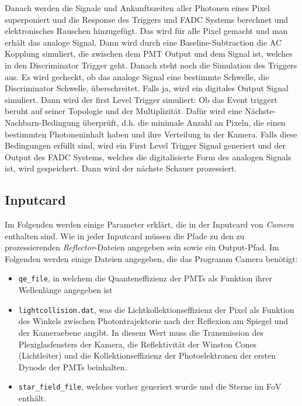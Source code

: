 Danach werden die Signale und Ankunftszeiten aller Photonen eines Pixel superponiert und die Response des Triggers und FADC Systems berechnet und elektronisches Rauschen hinzugefügt.
Das wird für alle Pixel gemacht und man erhält das analoge Signal.
Dann wird durch eine Baseline-Subtraction die AC Kopplung simuliert, die zwischen dem PMT Output und dem Signal ist, welches in den Discriminator Trigger geht.
Danach steht noch die Simulation des Triggers aus. 
Es wird gecheckt, ob das analoge Signal eine bestimmte Schwelle, die Discriminator Schwelle, überschreitet.
Falls ja, wird ein digitales Output Signal simuliert.
Dann wird der first Level Trigger simuliert:
Ob das Event triggert beruht auf seiner Topologie und der Multiplizität.
Dafür wird eine Nächste-Nachbarn-Bedingung überprüft, d.h. die minimale Anzahl an Pixeln, die einen bestimmten Photoneninhalt haben und ihre Verteilung in der Kamera.
Falls diese Bedingungen erfüllt sind, wird ein First Level Trigger Signal generiert und der Output des FADC Systems, welches die digitalisierte Form des analogen Signals ist, wird gespeichert.
Dann wird der nächste Schauer prozessiert.

\subsection{Inputcard}
Im Folgenden werden einige Parameter erklärt, die in der Inputcard von \textit{Camera} enthalten sind.
Wie in jeder Inputcard müssen die Pfade zu den zu prozessierenden \textit{Reflector}-Dateien angegeben sein sowie ein Output-Pfad.
Im Folgenden werden einige Dateien angegeben, die das Programm Camera benötigt:

\begin{itemize}
 \item \texttt{qe\_file}, in welchem die Quanteneffizienz der PMTs als Funktion ihrer Wellenlänge angegeben ist
 \item \texttt{lightcollision.dat}, was die Lichtkollektionseffizienz der Pixel als Funktion des Winkels zwischen Photontrajektorie nach der Reflexion am Spiegel und der Kameraebene angibt.
 In diesem Wert muss die Transmission des Plexiglasfensters der Kamera, die Reflektivität der Winston Cones (Lichtleiter) und die Kollektionseffizienz der Photoelektronen der ersten Dynode der PMTs beinhalten.
 \item \texttt{star\_field\_file}, welches vorher generiert wurde und die Sterne im FoV enthält.
\end{itemize}


